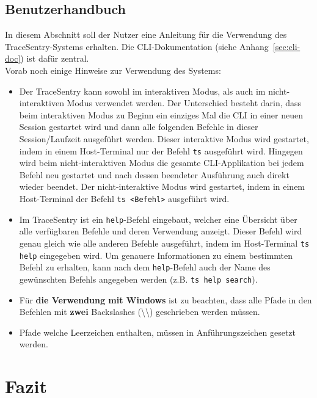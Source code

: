 \documentclass[a4paper,12pt]{report}
\begin{document}
    \clearpage


    \section{Benutzerhandbuch}
    \label{sec:user-manual}
    In diesem Abschnitt soll der Nutzer eine Anleitung für die Verwendung des TraceSentry-Systems erhalten.
    Die CLI-Dokumentation (siehe Anhang~\ref{sec:cli-doc}) ist dafür zentral.
    \\
    Vorab noch einige Hinweise zur Verwendung des Systems:
    \begin{itemize}
        \item Der TraceSentry kann sowohl im interaktiven Modus, als auch im nicht-interaktiven Modus verwendet werden.
        Der Unterschied besteht darin, dass beim interaktiven Modus zu Beginn ein einziges Mal die CLI in einer neuen Session gestartet wird und
        dann alle folgenden Befehle in dieser Session/Laufzeit ausgeführt werden.
        Dieser interaktive Modus wird gestartet, indem in einem Host-Terminal nur der Befehl \texttt{ts} ausgeführt wird.
        Hingegen wird beim nicht-interaktiven Modus die gesamte CLI-Applikation bei jedem Befehl neu gestartet und nach dessen beendeter Ausführung auch direkt wieder beendet.
        Der nicht-interaktive Modus wird gestartet, indem in einem Host-Terminal der Befehl \texttt{ts <Befehl>} ausgeführt wird.
        \item Im TraceSentry ist ein \texttt{help}-Befehl eingebaut, welcher eine Übersicht über alle verfügbaren Befehle und deren Verwendung anzeigt.
        Dieser Befehl wird genau gleich wie alle anderen Befehle ausgeführt, indem im Host-Terminal \texttt{ts help} eingegeben wird.
        Um genauere Informationen zu einem bestimmten Befehl zu erhalten, kann nach dem \texttt{help}-Befehl auch der Name des gewünschten Befehls angegeben werden (z.B. \texttt{ts help search}).
        \item Für \textbf{die Verwendung mit Windows} ist zu beachten, dass alle Pfade in den Befehlen mit \textbf{zwei} Backslashes (\textbackslash\textbackslash) geschrieben werden müssen.
        \item Pfade welche Leerzeichen enthalten, müssen in Anführungszeichen gesetzt werden.
    \end{itemize}


    \chapter{Fazit}
\end{document}
